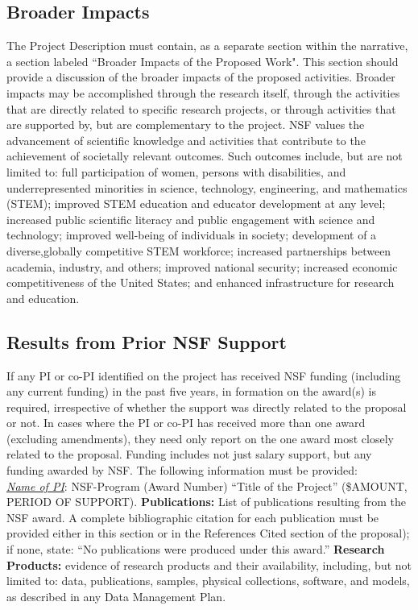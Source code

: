 \subsection{Broader Impacts }
The Project Description must contain, as a separate section within the narrative, a section labeled ``Broader
Impacts of the Proposed Work". This section should provide a discussion of the broader impacts of the proposed
activities. Broader impacts may be accomplished through the research itself, through the activities that are
directly related to specific research projects, or through activities that are supported by, but are complementary to
the project. NSF values the advancement of scientific knowledge and activities that contribute to the
achievement of societally relevant outcomes. Such outcomes include, but are not limited to: full
participation of women, persons with disabilities, and underrepresented minorities in science, technology, engineering, and
mathematics (STEM); improved STEM education and educator development at any level; increased public
scientific literacy and public engagement with science and technology; improved well-being of individuals in
society; development of a diverse,globally competitive STEM workforce; increased partnerships between
academia, industry, and others; improved national security; increased economic competitiveness of the United
States; and enhanced infrastructure for research and education.

\subsection{Results from Prior NSF Support }
If any PI or co-PI identified on the project has received NSF funding (including any current
funding) in the past five years, in formation on the award(s) is required,
irrespective of whether the support was directly related to the proposal or not.
In cases where the PI or co-PI has received more than one award (excluding amendments),
they need only report on the one award most closely related to the proposal. Funding includes not just salary
support, but any funding awarded by NSF. The following information must be provided:\\

\noindent
\emph{\underline{Name of PI}}: NSF-Program (Award Number) ``Title of the Project'' (\$AMOUNT, PERIOD OF SUPPORT).
{\bf Publications:} List of publications resulting from the NSF award. A complete bibliographic citation for each
publication must be provided either in this section or in the References Cited section of the proposal); if
none, state: ``No publications were produced under this award.'' {\bf Research Products:} evidence of research products
and their availability, including, but not limited to: data, publications, samples, physical collections, software,
and models, as described in any Data Management Plan.


